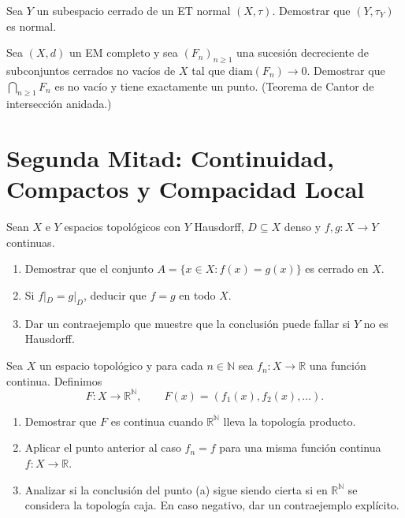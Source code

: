 \documentclass{article}
\theoremstyle{definition}
\newcommand{\R}{\mathbb{R}}
\newcommand{\N}{\mathbb{N}}
\newenvironment{ejercicio}[1]{\begin{trivlist}
\item[\hskip \labelsep {\bfseries Ejercicio}\hskip \labelsep {\bfseries #1.}]}{\end{trivlist}}
\begin{document}
\begin{ejercicio}{C2}
    Sea \(Y\) un subespacio cerrado de un ET normal \((X, \tau)\). Demostrar que \((Y, \tau_Y)\) es normal.
\end{ejercicio}

\begin{ejercicio}{C3}
    Sea \((X, d)\) un EM completo y sea \({(F_n)}_{n \geq 1}\) una sucesión decreciente de subconjuntos cerrados no vacíos de \(X\) tal que \(\mathrm{diam}(F_n) \to 0\). Demostrar que \(\bigcap_{n \geq 1} F_n\) es no vacío y tiene exactamente un punto. (Teorema de Cantor de intersección anidada.)
\end{ejercicio}

\clearpage

\section{Segunda Mitad: Continuidad, Compactos y Compacidad Local}

\begin{ejercicio}{13}
    Sean \(X\) e \(Y\) espacios topológicos con \(Y\) Hausdorff, \(D \subseteq X\) denso y \(f, g : X \to Y\) continuas.
    \begin{enumerate}
        \item Demostrar que el conjunto \(A = \{x \in X : f(x) = g(x)\}\) es cerrado en \(X\).
        \item Si \(f|_D = g|_D\), deducir que \(f = g\) en todo \(X\).
        \item Dar un contraejemplo que muestre que la conclusión puede fallar si \(Y\) no es Hausdorff.
    \end{enumerate}
\end{ejercicio}

\begin{ejercicio}{14}
    Sea \(X\) un espacio topológico y para cada \(n \in \N\) sea \(f_n : X \to \R\) una función continua. Definimos
    \[
        F : X \to \R^{\mathbb{N}}, \qquad F(x) = (f_1(x), f_2(x), \dots).
    \]
    \begin{enumerate}
        \item Demostrar que \(F\) es continua cuando \(\R^{\mathbb{N}}\) lleva la topología producto.
        \item Aplicar el punto anterior al caso \(f_n = f\) para una misma función continua \(f : X \to \R\).
        \item Analizar si la conclusión del punto (a) sigue siendo cierta si en \(\R^{\mathbb{N}}\) se considera la topología caja. En caso negativo, dar un contraejemplo explícito.
    \end{enumerate}
\end{ejercicio}
\end{document}
